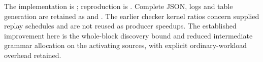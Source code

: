 The implementation is ;
reproduction is .
Complete JSON, logs and table generation are retained as
 and .
The earlier checker kernel ratios concern supplied replay schedules and are
not reused as producer speedups. The established improvement here is the
whole-block discovery bound and reduced intermediate grammar allocation on
the activating sources, with explicit ordinary-workload overhead retained.
